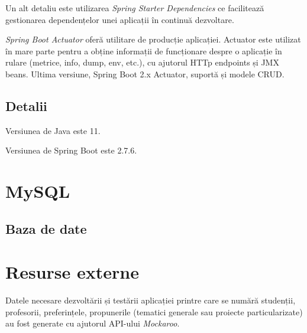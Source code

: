 Un alt detaliu este utilizarea \textit{Spring Starter Dependencies} ce facilitează gestionarea dependențelor unei aplicații în continuă dezvoltare.

\textit{Spring Boot Actuator} oferă utilitare de producție aplicației. Actuator este utilizat în mare parte pentru a obține informații de funcționare despre o aplicație în rulare (metrice, info, dump, env, etc.), cu ajutorul HTTp endpoints și JMX beans.
Ultima versiune, Spring Boot 2.x Actuator, suportă și modele CRUD.

\subsection{Detalii}
Versiunea de Java este 11.

Versiunea de Spring Boot este 2.7.6.

\section{MySQL}
\subsection{Baza de date}



\section{Resurse externe}
Datele necesare dezvoltării și testării aplicației printre care se numără studenții, profesorii, preferințele, propunerile (tematici generale sau proiecte particularizate) au fost generate cu ajutorul API-ului \textit{Mockaroo}.